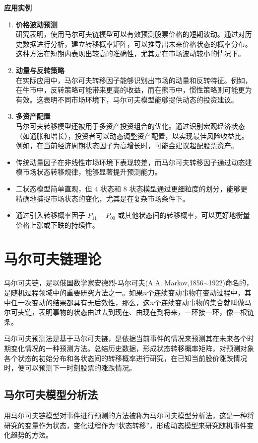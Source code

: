 \documentclass[a4paper]{article}
\begin{document}
\noindent \textbf{应用实例}
\begin{enumerate}
    \item \textbf{价格波动预测}\\
      研究表明，使用马尔可夫链模型可以有效预测股票价格的短期波动。通过对历史数据进行分析，建立转移概率矩阵，可以推导出未来价格状态的概率分布。这种方法在短期内表现出较高的准确性，尤其是在市场波动较小的情况下。
    \item \textbf{动量与反转策略}\\
      在实际应用中，马尔可夫转移因子能够识别出市场的动量和反转特征。例如，在牛市中，反转策略可能带来更高的收益，而在熊市中，惯性策略则可能更为有效。这表明不同市场环境下，马尔可夫模型能够提供动态的投资建议。
    \item \textbf{多资产配置}\\
    马尔可夫转移模型还被用于多资产投资组合的优化。通过识别宏观经济状态（如通胀和增长），投资者可以动态调整资产配置，以实现最佳风险收益比。例如，在当前经济周期状态因子为高增长时，可能会建议超配股票资产。
\end{enumerate}
\begin{itemize}
    \item 传统动量因子在非线性市场环境下表现较差，而马尔可夫转移因子通过动态建模市场状态转移规律，能够显著提升预测能力。
    \item 二状态模型简单直观，但 4 状态和 8 状态模型通过更细粒度的划分，能够更精确地捕捉市场状态的变化，尤其是在复杂市场条件下。
    \item 通过引入转移概率因子 \( P_{11} - P_{00} \) 或其他状态间的转移概率，可以更好地衡量价格上涨或下跌的持续性。
\end{itemize}

\section{\textbf{马尔可夫链理论}}
马尔可夫链，是以俄国数学家安德烈-马尔可夫(A.A. Markov,1856$\sim$1922)命名的，是随机过程领域中的重要研究方法之一。如果$n$个连续变动事物在变动过程中，其中任一次变动的结果都具有无后效性，那么，这$n$个连续变动事物的集合就叫做马尔可夫链，表明事物的状态由过去到现在、由现在到将来，一环接一环，像一根链条\cite{liu2008stochastic}。

马尔可夫预测法是基于马尔可夫链，是依据当前事件的情况来预测其在未来各个时期变化情况的一种预测方法。总结历史数据，形成状态转移概率矩阵，对预测对象各个状态的初始分布和各状态间的转移概率进行研究，在已知当前股价涨跌情况时，便可以预测下一时刻股票的涨跌情况。\cite*{fu2023prediction}
\subsection{马尔可夫模型分析法}
用马尔可夫链模型对事件进行预测的方法被称为马尔可夫模型分析法，这是一种将研究的变量作为状态，变化过程作为“状态转移”，形成动态模型来研究随机事件变化趋势的方法。
\end{document}
